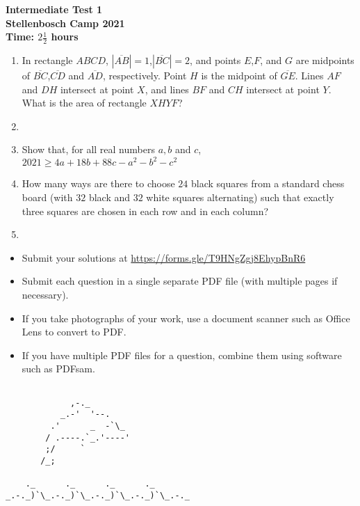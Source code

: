 \documentclass{article}
\begin{document}
\thispagestyle{empty}

\begin{center}
  \textbf{\Large Intermediate Test 1}
  \\ \vspace{1em}
  \textbf{\large Stellenbosch Camp 2021}
  \\ \vspace{1em}
  \textbf{\large Time: $2\frac{1}{2}$ hours}
\end{center}

\vspace{24pt}

\begin{enumerate}[1.]

\item %
In rectangle $ABCD$, $|\overline{AB}|=1$,$|\overline{BC}|=2$, and points $E$,$F$, and $G$ are midpoints of $\overline{BC}$,$\overline{CD}$ and $\overline{AD}$, respectively. Point $H$ is the midpoint of $\overline{GE}$. Lines $AF$ and $DH$ intersect at point $X$, and lines $BF$ and $CH$ intersect at point $Y$. What is the area of rectangle $XHYF$?


\item %


\item %
Show that, for all real numbers $a,b$ and $c$,  $2021 \geq 4a + 18b + 88c - a^2 - b^2 - c^2$ 

\item %
How many ways are there to choose $24$ black squares from a standard chess board (with $32$ black and $32$ white squares alternating) such that exactly three squares are chosen in each row and in each column?


\item %

\end{enumerate}


\vfill
\begin{itemize}
	\item Submit your solutions at \href{https://forms.gle/T9HNgZgj8EhypBnR6}{https://forms.gle/T9HNgZgj8EhypBnR6}
	\item Submit each question in a single separate PDF file (with multiple pages if necessary).
	\item If you take photographs of your work, use a document scanner such as Office Lens to convert to PDF.
	\item If you have multiple PDF files for a question, combine them using software such as PDFsam.
\end{itemize}


\vfill

\centering
\begin{BVerbatim}

             ,-._
           _.-'  '--.
         .'      _  -`\_
        / .----.`_.'----'
        ;/     `
       /_;

    ._      ._      ._      ._
_.-._)`\_.-._)`\_.-._)`\_.-._)`\_.-._

\end{BVerbatim}
\end{document}
